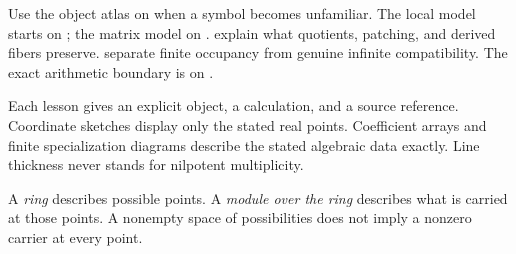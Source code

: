 Use the object atlas on  when a symbol becomes unfamiliar. The local model starts on ; the matrix model on .  explain what quotients, patching, and derived fibers preserve.  separate finite occupancy from genuine infinite compatibility. The exact arithmetic boundary is on .

Each lesson gives an explicit object, a calculation, and a source reference. Coordinate sketches display only the stated real points. Coefficient arrays and finite specialization diagrams describe the stated algebraic data exactly. Line thickness never stands for nilpotent multiplicity.


A \emph{ring} describes possible points. A \emph{module over the ring} describes what is carried at those points. A nonempty space of possibilities does not imply a nonzero carrier at every point.

